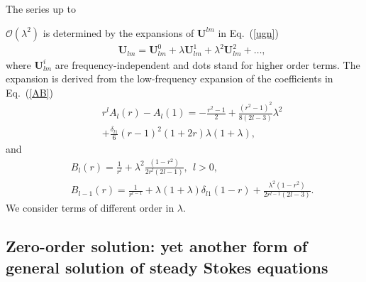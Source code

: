 \documentclass[aps,prx,twocolumn,amsmath,amssymb,amsfonts]{revtex4-2}
\begin{document}
The series up to {$\mathcal O(\lambda^2)$ is determined by the expansions of $\bm U^{lm}$ in Eq.~(\ref{ugn})
\begin{eqnarray}&&
\bm U_{lm}=\bm U^0_{lm}+\lambda\bm U^1_{lm}+\lambda^2\bm U^2_{lm}+\ldots,
\end{eqnarray}
where $\bm U^i_{lm}$ are frequency-independent and dots stand for higher order terms.
The expansion is derived from the low-frequency expansion of the coefficients in Eq.~(\ref{AB})
\begin{eqnarray}&&
r^lA_l(r)-A_l(1) =
-\frac{r^2-1}{2} +
\frac{(r^2-1)^2}{8(2l-3)}\lambda^2
\nonumber\\&&
+\frac{\delta_{l1}}{6}(r-1)^2(1+2r)\lambda(1+\lambda),
\label{Adef}
\end{eqnarray}
and
\begin{eqnarray}&&\!\!\!\!\!\!\!\!\!
B_l(r) = \frac{1}{r^l} +\lambda^2 \frac{(1-r^2)}{2r^l(2l-1)},\ \ l>0,
\label{Bdef}\\&&
\!\!\!\!\!\!\!\!\!B_{l-1}(r) \!=\! \frac{1}{r^{l-1}} \!+\!\lambda(1\!+\!\lambda)\delta_{l1}(1-r) \!+\!\frac{\lambda^2(1\!-\!r^2)}{2r^{l-1}(2l\!-\!3)}.
\nonumber
\end{eqnarray}
We consider terms of different order in $\lambda$.

\subsection{Zero-order solution: yet another form of general solution of steady Stokes equations}

}
\end{document}
